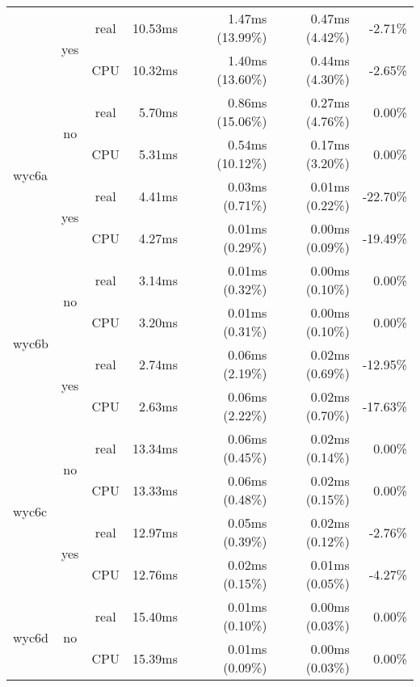 \documentclass[en]{pracamgr}
\begin{document}
\begin{appendices}
\begin{small}
\begin{longtable}{|l|c|c|r|r|r|r|}
                          \cline{2-7}
                          & \multirow{2}{*}{yes} & real & 10.53ms & 1.47ms (13.99\%) & 0.47ms (4.42\%) & -2.71\% \\*
                          &                      & CPU  & 10.32ms & 1.40ms (13.60\%) & 0.44ms (4.30\%) & -2.65\% \\
\hline
\multirow{4}{*}{wyc6a}    & \multirow{2}{*}{no}  & real & 5.70ms & 0.86ms (15.06\%) & 0.27ms (4.76\%) & 0.00\% \\*
                          &                      & CPU  & 5.31ms & 0.54ms (10.12\%) & 0.17ms (3.20\%) & 0.00\% \\*
                          \cline{2-7}
                          & \multirow{2}{*}{yes} & real & 4.41ms & 0.03ms (0.71\%) & 0.01ms (0.22\%) & -22.70\% \\*
                          &                      & CPU  & 4.27ms & 0.01ms (0.29\%) & 0.00ms (0.09\%) & -19.49\% \\
\hline
\multirow{4}{*}{wyc6b}    & \multirow{2}{*}{no}  & real & 3.14ms & 0.01ms (0.32\%) & 0.00ms (0.10\%) & 0.00\% \\*
                          &                      & CPU  & 3.20ms & 0.01ms (0.31\%) & 0.00ms (0.10\%) & 0.00\% \\*
                          \cline{2-7}
                          & \multirow{2}{*}{yes} & real & 2.74ms & 0.06ms (2.19\%) & 0.02ms (0.69\%) & -12.95\% \\*
                          &                      & CPU  & 2.63ms & 0.06ms (2.22\%) & 0.02ms (0.70\%) & -17.63\% \\
\hline
\multirow{4}{*}{wyc6c}    & \multirow{2}{*}{no}  & real & 13.34ms & 0.06ms (0.45\%) & 0.02ms (0.14\%) & 0.00\% \\*
                          &                      & CPU  & 13.33ms & 0.06ms (0.48\%) & 0.02ms (0.15\%) & 0.00\% \\*
                          \cline{2-7}
                          & \multirow{2}{*}{yes} & real & 12.97ms & 0.05ms (0.39\%) & 0.02ms (0.12\%) & -2.76\% \\*
                          &                      & CPU  & 12.76ms & 0.02ms (0.15\%) & 0.01ms (0.05\%) & -4.27\% \\
\hline
\multirow{4}{*}{wyc6d}    & \multirow{2}{*}{no}  & real & 15.40ms & 0.01ms (0.10\%) & 0.00ms (0.03\%) & 0.00\% \\*
                          &                      & CPU  & 15.39ms & 0.01ms (0.09\%) & 0.00ms (0.03\%) & 0.00\% \\*

\end{longtable}
\end{small}
\end{appendices}
\end{document}
